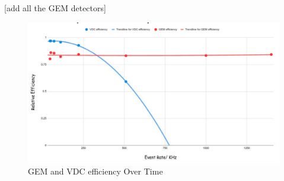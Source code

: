 [add all the GEM detectors]



\begin{figure}[!htbp]
    \centering
    \includegraphics[width=\textwidth]{images/chap5/gem efficiency over time.png}
    \caption{GEM and VDC efficiency Over Time}
    \label{fig:gem_efficiency_over_time}
\end{figure}